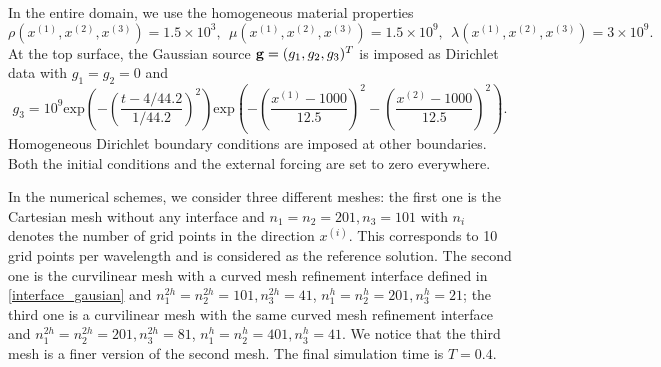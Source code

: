 In the entire domain, we use the homogeneous material properties
\begin{equation*}
\rho(x^{(1)},x^{(2)},x^{(3)}) = 1.5\times 10^3,\ \  \mu(x^{(1)},x^{(2)},x^{(3)}) = 1.5\times 10^9,\ \ 
\lambda(x^{(1)},x^{(2)},x^{(3)})  = 3\times 10^9.
\end{equation*}
At the top surface, the Gaussian source 
${\bf g} = (g_1,g_2,g_3)^T$ is imposed as Dirichlet data with $g_1 = g_2 = 0$ and 
\[g_3 = 10^9 \text{exp}\left(-\left(\frac{t-4/44.2}{1/44.2}\right)^2\right)\text{exp}\left(-\left(\frac{x^{(1)}-1000}{12.5}\right)^2-\left(\frac{x^{(2)}-1000}{12.5}\right)^2\right).\]  
Homogeneous Dirichlet boundary conditions are imposed at other boundaries. Both the initial conditions and the external forcing are set to zero everywhere.%

In the numerical schemes, we consider three different meshes: the first one is the Cartesian mesh without any interface and $n_1 = n_2 = 201, n_3 = 101$ with $n_i$ denotes the number of grid points in the direction $x^{(i)}$. This corresponds to 10 grid points per wavelength and is considered as the  reference solution. The second one is the curvilinear mesh with a curved mesh refinement interface defined in \eqref{interface_gausian} and $n_1^{2h} = n_2^{2h} = 101, n_3^{2h} = 41$, $n_1^h = n_2^h = 201, n_3^h = 21$; the third one is a curvilinear mesh with the same curved mesh refinement interface and $n_1^{2h} = n_2^{2h} = 201, n_3^{2h} = 81$, $n_1^h = n_2^h = 401, n_3^h = 41$. We notice that the third mesh is a finer version of the second mesh. The final simulation time is $T = 0.4$.

